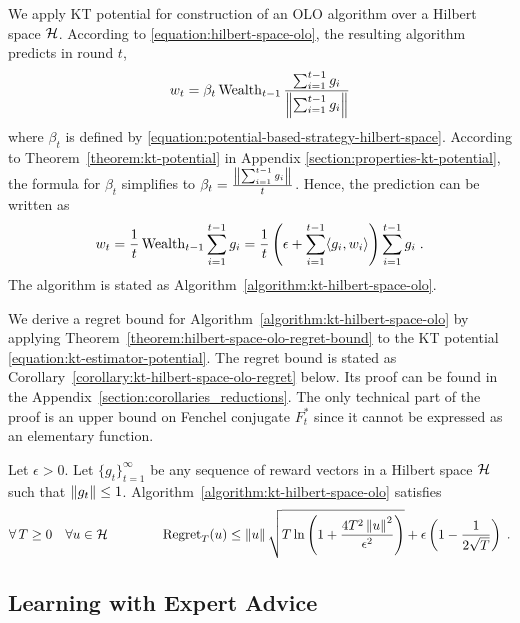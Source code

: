 We apply KT potential for construction of an OLO algorithm over a Hilbert
space $\mathcal{H}$. According to \eqref{equation:hilbert-space-olo}, the resulting algorithm predicts
in round $t$,
$$
w_t = \beta_t \operatorname{Wealth}_{t-1} \frac{\sum_{i=1}^{t-1} g_i}{\left\|{\sum_{i=1}^{t-1} g_i}\right\|}
$$
where $\beta_t$ is defined by
\eqref{equation:potential-based-strategy-hilbert-space}. According to
Theorem~\ref{theorem:kt-potential} in Appendix
\ref{section:properties-kt-potential}, the formula for $\beta_t$ simplifies to
$\beta_t = \frac{\left\|{\sum_{i=1}^{t-1} g_i}\right\|}{t}$. Hence, the prediction can be
written as
$$
w_t
= \frac{1}{t} \operatorname{Wealth}_{t-1} \sum_{i=1}^{t-1} g_i
= \frac{1}{t} \left(\epsilon + \sum_{i=1}^{t-1} \langle g_i, w_i \rangle \right) \sum_{i=1}^{t-1} g_i \; .
$$
The algorithm is stated as Algorithm~\ref{algorithm:kt-hilbert-space-olo}.

We derive a regret bound for Algorithm~\ref{algorithm:kt-hilbert-space-olo} by
applying Theorem~\ref{theorem:hilbert-space-olo-regret-bound} to the KT
potential \eqref{equation:kt-estimator-potential}. The regret bound is stated as
Corollary~\ref{corollary:kt-hilbert-space-olo-regret} below. Its proof can be
found in the Appendix~\ref{section:corollaries_reductions}. The only technical
part of the proof is an upper bound on Fenchel conjugate $F_t^*$ since it cannot
be expressed as an elementary function.

\begin{corollary}
\label{corollary:kt-hilbert-space-olo-regret}
Let $\epsilon > 0$. Let $\{g_t\}_{t=1}^\infty$ be any sequence of reward vectors
in a Hilbert space $\mathcal{H}$ such that $\left\|{g_t}\right\| \le 1$.
Algorithm~\ref{algorithm:kt-hilbert-space-olo} satisfies
$$
\forall \, T \ge 0 \quad
\forall u \in \mathcal{H} \qquad \qquad
\operatorname{Regret}_T(u) \le \left\|{u}\right\| \sqrt{T \ln\left(1 + \frac{4T^2 \left\|{u}\right\|^2}{\epsilon^2} \right)} + \epsilon \left(1 - \frac{1}{2\sqrt{T}} \right) \;.
$$
\end{corollary}

\subsection{Learning with Expert Advice}

